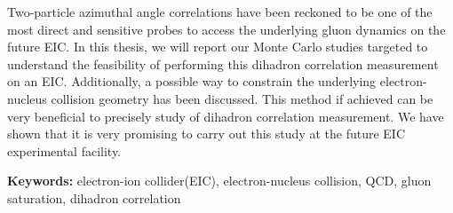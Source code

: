 {Two-particle azimuthal angle correlations have been reckoned to be one of the
most direct and sensitive probes to access the underlying gluon dynamics on the
future EIC. In this thesis, we will report our Monte Carlo studies targeted to
understand the feasibility of performing this dihadron correlation measurement
on an EIC. Additionally, a possible way to constrain the underlying
electron-nucleus collision geometry has been discussed. This method if achieved
can be very beneficial to precisely study of dihadron correlation measurement.
We have shown that it is very promising to carry out this study at the future
EIC experimental facility.


\vspace{4mm}


\textbf{Keywords:} electron-ion collider(EIC), electron-nucleus collision, QCD, gluon saturation, dihadron correlation


}
